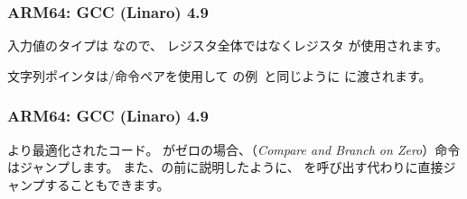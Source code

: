 \subsubsection{ARM64: \NonOptimizing GCC (Linaro) 4.9}



入力値のタイプは \Tint なので、  レジスタ全体ではなくレジスタ  が使用されます。

文字列ポインタは/命令ペアを使用して\q{\HelloWorldSectionName}
の例~と同じように \puts に渡されます。

\subsubsection{ARM64: \Optimizing GCC (Linaro) 4.9}



より最適化されたコード。
がゼロの場合、（\emph{Compare and Branch on Zero}）命令はジャンプします。
また、の前に説明したように、 \puts を呼び出す代わりに直接ジャンプすることもできます。

